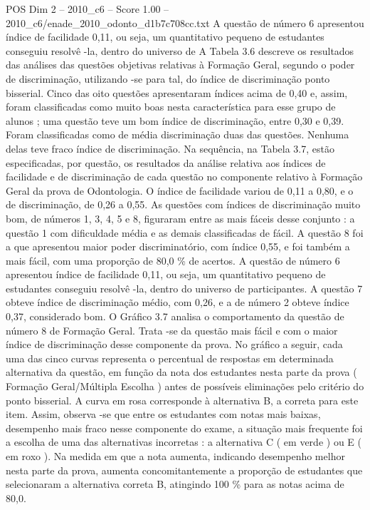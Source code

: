 \begin{textsample}{POS Dim 2 – 2010\_c6 – Score 1.00 – 2010\_c6/enade\_2010\_odonto\_d1b7c708cc.txt}
A questão de número 6 apresentou índice de facilidade 0,11, ou seja, um quantitativo pequeno de estudantes conseguiu resolvê -la, dentro do universo de A Tabela 3.6 descreve os resultados das análises das questões objetivas relativas à Formação Geral, segundo o poder de discriminação, utilizando -se para tal, do índice de discriminação ponto bisserial.
Cinco das oito questões apresentaram índices acima de 0,40 e, assim, foram classificadas como muito boas nesta característica para esse grupo de alunos ; uma questão teve um bom índice de discriminação, entre 0,30 e 0,39.
Foram classificadas como de média discriminação duas das questões.
Nenhuma delas teve fraco índice de discriminação.
Na sequência, na Tabela 3.7, estão especificadas, por questão, os resultados da análise relativa aos índices de facilidade e de discriminação de cada questão no componente relativo à Formação Geral da prova de Odontologia.
O índice de facilidade variou de 0,11 a 0,80, e o de discriminação, de 0,26 a 0,55.
As questões com índices de discriminação muito bom, de números 1, 3, 4, 5 e 8, figuraram entre as mais fáceis desse conjunto : a questão 1 com dificuldade média e as demais classificadas de fácil.
A questão 8 foi a que apresentou maior poder discriminatório, com índice 0,55, e foi também a mais fácil, com uma proporção de 80,0 \% de acertos.
A questão de número 6 apresentou índice de facilidade 0,11, ou seja, um quantitativo pequeno de estudantes conseguiu resolvê -la, dentro do universo de participantes.
A questão 7 obteve índice de discriminação médio, com 0,26, e a de número 2 obteve índice 0,37, considerado bom.
O Gráfico 3.7 analisa o comportamento da questão de número 8 de Formação Geral.
Trata -se da questão mais fácil e com o maior índice de discriminação desse componente da prova.
No gráfico a seguir, cada uma das cinco curvas representa o percentual de respostas em determinada alternativa da questão, em função da nota dos estudantes nesta parte da prova ( Formação Geral/Múltipla Escolha ) antes de possíveis eliminações pelo critério do ponto bisserial.
A curva em rosa corresponde à alternativa B, a correta para este item.
Assim, observa -se que entre os estudantes com notas mais baixas, desempenho mais fraco nesse componente do exame, a situação mais frequente foi a escolha de uma das alternativas incorretas : a alternativa C ( em verde ) ou E ( em roxo ).
Na medida em que a nota aumenta, indicando desempenho melhor nesta parte da prova, aumenta concomitantemente a proporção de estudantes que selecionaram a alternativa correta B, atingindo 100 \% para as notas acima de 80,0.

\end{textsample}
